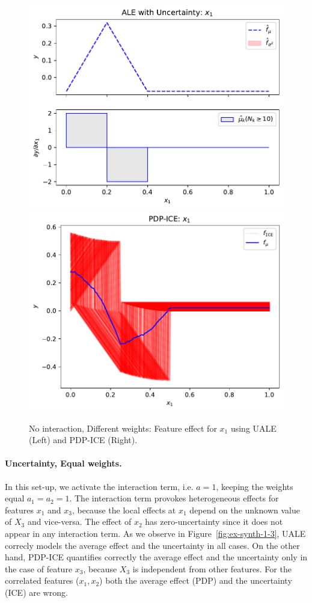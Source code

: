 \documentclass[twoside]{article}
\begin{document}
\begin{figure}[h]
  \centering
  \includegraphics[width=.23\textwidth]{example_2/dale_feat_0.pdf}
  \includegraphics[width=.23\textwidth]{example_2/pdp_ice_feat_0.pdf}
  \caption{No interaction, Different weights: Feature effect for \(x_1\)
    using UALE (Left) and PDP-ICE (Right).}
  \label{fig:ex-synth-1-2}
\end{figure}

\paragraph{Uncertainty, Equal weights.}

In this set-up, we activate the interaction term, i.e.  \(a=1\),
keeping the weights equal \(a_1=a_2=1\). The interaction term provokes
heterogeneous effects for features \(x_1\) and \(x_3\), because the
local effects at \(x_1\) depend on the unknown value of \(X_3\) and
vice-versa. The effect of \(x_2\) has zero-uncertainty since it does
not appear in any interaction term.  As we observe in
Figure~\ref{fig:ex-synth-1-3}, UALE correcly models the average effect
and the uncertainty in all cases.  On the other hand, PDP-ICE
quantifies correctly the average effect and the uncertainty only in
the case of feature \(x_3\), because \(X_3\) is independent from other
features. For the correlated features (\(x_1, x_2\)) both the average
effect (PDP) and the uncertainty (ICE) are wrong.
\end{document}
